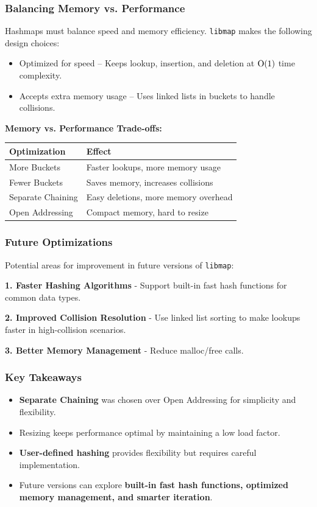 \documentclass[titlepage]{article}
\begin{document}
\subsubsection{Balancing Memory vs. Performance}
Hashmaps must balance speed and memory efficiency.
\texttt{libmap} makes the following design choices:
\begin{itemize}
    \item Optimized for speed -- Keeps lookup, insertion, and deletion at \( $O(1)$ \) time complexity.
    \item Accepts extra memory usage -- Uses linked lists in buckets to handle collisions.
\end{itemize}

\textbf{Memory vs. Performance Trade-offs:}
\begin{center}
\begin{tabular}{@{} l l @{} }
\toprule
\textbf{Optimization} & \textbf{Effect} \\
\midrule
More Buckets & Faster lookups, more memory usage \\
Fewer Buckets & Saves memory, increases collisions \\
Separate Chaining & Easy deletions, more memory overhead \\
Open Addressing & Compact memory, hard to resize \\
\bottomrule
\end{tabular}
\end{center}

\subsubsection{Future Optimizations}
Potential areas for improvement in future versions of \texttt{libmap}:

\textbf{1. Faster Hashing Algorithms}
- Support built-in fast hash functions for common data types.

\textbf{2. Improved Collision Resolution}
- Use linked list sorting to make lookups faster in high-collision scenarios.

\textbf{3. Better Memory Management}
- Reduce malloc/free calls.


\subsubsection{Key Takeaways}
\begin{itemize}
    \item \textbf{Separate Chaining} was chosen over Open Addressing for simplicity and flexibility.
    \item Resizing keeps performance optimal by maintaining a low load factor.
    \item \textbf{User-defined hashing} provides flexibility but requires careful implementation.
    \item Future versions can explore \textbf{built-in fast hash functions, optimized memory management, and smarter iteration}.
\end{itemize}
\end{document}
